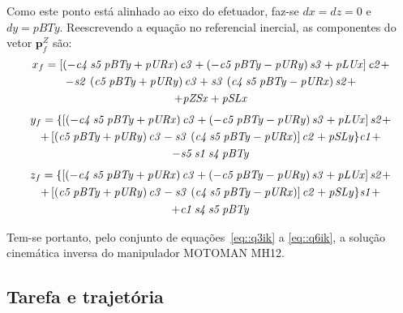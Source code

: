 Como este ponto está alinhado ao eixo do efetuador, faz-se $dx = dz = 0$ e $dy
= pBTy$.
Reescrevendo a equação no referencial inercial, as componentes do vetor
$\mathbf{p}_{f}^{Z}$ são:
%
\begin{multline}
	x_f =  \left[  \left( -{\it c4}\,{\it s5}\,{\it pBTy}+{\it pURx} \right) {
		\it c3}+ \left( -{\it c5}\,{\it pBTy}-{\it pURy} \right) {\it s3}+{
		\it pLUx} \right] {\it c2} +
		\\ -{\it s2}\, \left( {\it c5}\,{\it pBTy}+{
		\it pURy} \right) {\it c3}+{\it s3}\, \left( {\it c4}\,{\it s5}\,{\it 
		pBTy}-{\it pURx} \right) {\it s2}+
		\\ +{\it pZSx}+{\it pSLx}
\end{multline}
\vspace{-15mm}
\begin{multline}
	y_f =  \{ \left[  \left( -{\it c4}\,{\it s5}\,{\it pBTy}+{\it pURx}
 		\right) {\it c3}+ \left( -{\it c5}\,{\it pBTy}-{\it pURy} \right) {
		\it s3}+{\it pLUx} \right] {\it s2}+ 
		\\ + \left[  \left( {\it c5}\,{\it 
		pBTy}+{\it pURy} \right) {\it c3}-{\it s3}\, \left( {\it c4}\,{\it s5}
		\,{\it pBTy}-{\it pURx} \right)  \right] {\it c2}+{\it pSLy} \} {
		\it c1} +
		\\ -{\it s5}\,{\it s1}\,{\it s4}\,{\it pBTy}
\end{multline}
\vspace{-15mm}
\begin{multline}
	z_f =  \{  \left[ \left( -{\it c4}\,{\it s5}\,{\it pBTy}+{\it pURx}
 		\right) {\it c3}+ \left( -{\it c5}\,{\it pBTy}-{\it pURy} \right) {
		\it s3}+{\it pLUx} \right] {\it s2}+ 
		\\ + \left[ \left( {\it c5}\,{\it 
		pBTy}+{\it pURy} \right) {\it c3}-{\it s3}\, \left( {\it c4}\,{\it s5}
		\,{\it pBTy}-{\it pURx} \right)  \right] {\it c2}+{\it pSLy} \} {
		\it s1} +
		\\ +{\it c1}\,{\it s4}\,{\it s5}\,{\it pBTy}
\end{multline}



Tem-se portanto, pelo conjunto de equações~\ref{eq::q3ik} a \ref{eq::q6ik}, a
solução cinemática inversa do manipulador MOTOMAN MH12.


\subsection{Tarefa e trajetória} \label{sec::tarefa_traj}

